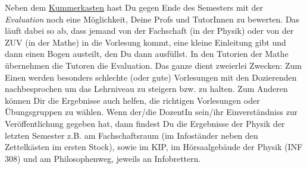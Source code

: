 \newpage{}
\label{eval}

\noindent Neben dem \hyperref[kummerkasten]{Kummerkasten} hast Du gegen Ende des Semesters mit der \emph{Evaluation} noch eine Möglichkeit, Deine Profs und TutorInnen zu bewerten. Das läuft dabei so ab, dass jemand von der Fachschaft (in der Physik) oder von der ZUV (in der Mathe) in die Vorlesung kommt, eine kleine Einleitung gibt und dann einen Bogen austeilt, den Du dann ausfüllst. In den Tutorien der Mathe übernehmen die Tutoren die Evaluation.  Das ganze dient zweierlei Zwecken: Zum Einen werden besonders schlechte (oder gute) Vorlesungen mit den Dozierenden nachbesprochen um das Lehrniveau zu steigern bzw. zu halten. Zum Anderen können Dir die Ergebnisse auch helfen, die richtigen Vorlesungen oder Übungsgruppen zu wählen. Wenn der/die DozentIn sein/ihr Einverständniss zur Veröffentlichung gegeben hat, dann findest Du die Ergebnisse der Physik der letzten Semester z.B. am Fachschaftsraum (im Infoständer neben den Zettelkästen im ersten Stock), sowie im \gls{KIP}, im Hörsaalgebäude der Physik (\Gls{INF} 308) und am Philosophenweg, jeweils an Infobrettern.
